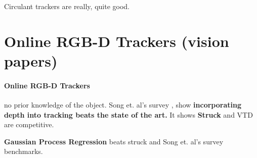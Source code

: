 Circulant trackers are really, quite good.



\section{Online RGB-D Trackers (vision papers)}
\label{sec:online}
\paragraph{Online RGB-D Trackers} no prior knowledge of the object.
Song et. al's survey \cite{song2013tracking}, show \textbf{incorporating depth into tracking beats the state of the art.} It shows \textbf{Struck} \cite{hare2011struck} and VTD are competitive.

\textbf{Gaussian Process Regression} \cite{gao2014transfer} beats struck and Song et. al's survey benchmarks.

